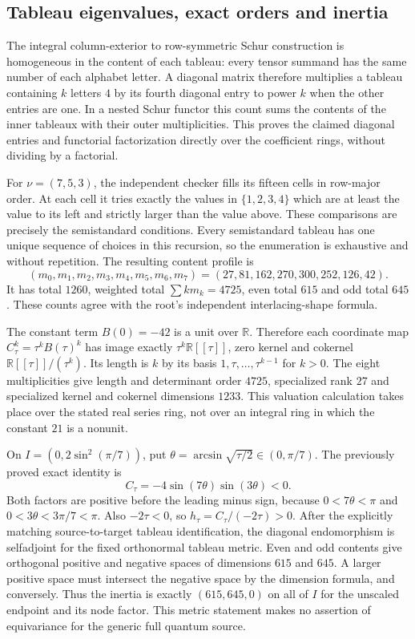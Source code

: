 \subsection*{Tableau eigenvalues, exact orders and inertia}

The integral column-exterior to row-symmetric Schur construction is
homogeneous in the content of each tableau: every tensor summand
has the same number of each alphabet letter. A diagonal matrix
therefore multiplies a tableau containing $k$ letters $4$ by its
fourth diagonal entry to power $k$ when the other entries are one.
In a nested Schur functor this count sums the contents of the inner
tableaux with their outer multiplicities. This proves the claimed
diagonal entries and functorial factorization directly over the
coefficient rings, without dividing by a factorial.

For $\nu=(7,5,3)$, the independent checker fills its fifteen cells
in row-major order. At each cell it tries exactly the values in
$\{1,2,3,4\}$ which are at least the value to its left and strictly
larger than the value above. These comparisons are precisely the
semistandard conditions. Every semistandard tableau has one unique
sequence of choices in this recursion, so the enumeration is
exhaustive and without repetition. The resulting content profile is
\[
 (m_0,m_1,m_2,m_3,m_4,m_5,m_6,m_7)
 =(27,81,162,270,300,252,126,42).
\]
It has total $1260$, weighted total $\sum k m_k=4725$, even total
$615$ and odd total $645$. These counts agree with the root's
independent interlacing-shape formula.

The constant term $B(0)=-42$ is a unit over $\mathbb R$. Therefore
each coordinate map $C_\tau^k=\tau^kB(\tau)^k$ has image exactly
$\tau^k\mathbb R[[\tau]]$, zero kernel and cokernel
$\mathbb R[[\tau]]/(\tau^k)$. Its length is $k$ by its basis
$1,\tau,\ldots,\tau^{k-1}$ for $k>0$. The eight multiplicities
give length and determinant order $4725$, specialized rank $27$
and specialized kernel and cokernel dimensions $1233$. This
valuation calculation takes place over the stated real series ring,
not over an integral ring in which the constant $21$ is a nonunit.

On $I=(0,2\sin^2(\pi/7))$, put
$\theta=\arcsin\sqrt{\tau/2}\in(0,\pi/7)$. The previously proved
exact identity is
\[
 C_\tau=-4\sin(7\theta)\sin(3\theta)<0.
\]
Both factors are positive before the leading minus sign, because
$0<7\theta<\pi$ and $0<3\theta<3\pi/7<\pi$.
Also $-2\tau<0$, so $h_\tau=C_\tau/(-2\tau)>0$.
After the explicitly matching source-to-target tableau identification,
the diagonal endomorphism is selfadjoint for the fixed orthonormal
tableau metric. Even and odd contents give orthogonal positive and
negative spaces of dimensions $615$ and $645$. A larger positive
space must intersect the negative space by the dimension formula,
and conversely. Thus the inertia is exactly $(615,645,0)$ on all
of $I$ for the unscaled endpoint and its node factor. This metric
statement makes no assertion of equivariance for the generic full
quantum source.

